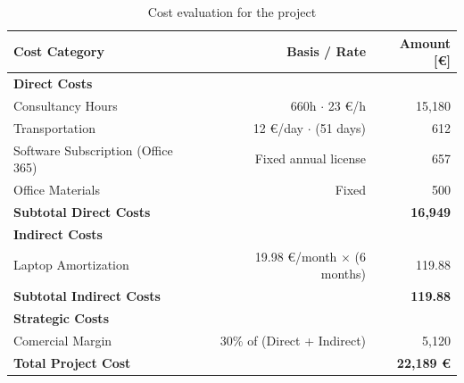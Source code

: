 \begin{table}[ht]
\centering
\renewcommand{\arraystretch}{1.3}
\begin{tabular}{lrr}
\hline
\textbf{Cost Category} & \textbf{Basis / Rate} & \textbf{Amount [\euro]} \\
\hline
\multicolumn{3}{l}{\textbf{Direct Costs}} \\
\quad Consultancy Hours & 660h $\cdot$ 23 \euro/h & 15,180 \\
\quad Transportation & 12 \euro/day $\cdot$ (51 days) & 612 \\
\quad Software Subscription (Office 365) & Fixed annual license & 657 \\
\quad Office Materials & Fixed & 500\\
\hline
\textbf{Subtotal Direct Costs} & & \textbf{16,949} \\
\hline
\multicolumn{3}{l}{\textbf{Indirect Costs}} \\
\quad Laptop Amortization & 19.98 \euro/month $\times$ (6 months) & 119.88  \\
\hline
\textbf{Subtotal Indirect Costs} & & \textbf{119.88} \\
\hline
\multicolumn{3}{l}{\textbf{Strategic Costs}} \\
\quad Comercial Margin & 30\% of (Direct + Indirect) & 5,120 \\
\hline
\textbf{Total Project Cost} & & \textbf{22,189 \euro} \\
\hline
\end{tabular}
\caption{Cost evaluation for the project}
\label{tab:cost_evaluation}
\end{table}
